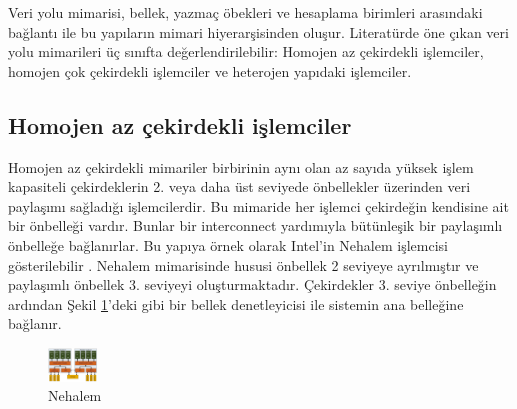 Veri yolu mimarisi, bellek, yazmaç öbekleri ve hesaplama birimleri arasındaki bağlantı ile bu yapıların mimari hiyerarşisinden oluşur. Literatürde öne çıkan veri yolu mimarileri üç sınıfta değerlendirilebilir: Homojen az çekirdekli işlemciler, homojen çok çekirdekli işlemciler ve heterojen yapıdaki işlemciler. \par

\subsection{Homojen az çekirdekli işlemciler}
Homojen az çekirdekli mimariler birbirinin aynı olan az sayıda yüksek işlem kapasiteli çekirdeklerin 2. veya daha üst seviyede önbellekler üzerinden veri paylaşımı sağladığı işlemcilerdir. Bu mimaride her işlemci çekirdeğin kendisine ait bir önbelleği vardır. Bunlar bir interconnect yardımıyla bütünleşik bir paylaşımlı önbelleğe bağlanırlar. Bu yapıya örnek olarak Intel'in Nehalem işlemcisi gösterilebilir \cite{molka2009memory} \cite{hackenberg2009comparing}. Nehalem mimarisinde hususi önbellek 2 seviyeye ayrılmıştır ve paylaşımlı önbellek 3. seviyeyi oluşturmaktadır. Çekirdekler 3. seviye önbelleğin ardından Şekil \ref{image:nehalem}'deki gibi bir bellek denetleyicisi ile sistemin ana belleğine bağlanır.\par

\begin{figure}[h] \label{image:nehalem} 
\centering \includegraphics[width=50]{gorsel/nehalem.jpg} \caption{Nehalem}  
\end{figure}

